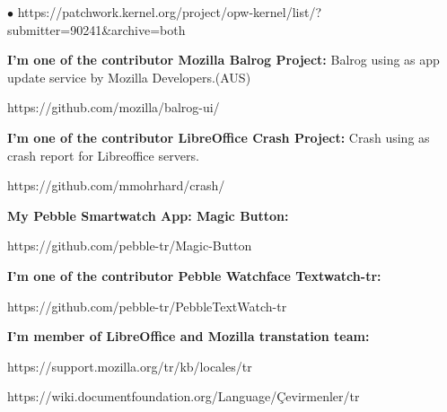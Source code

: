 \documentclass[margin,line]{res}
\newenvironment{list2}{
  \begin{list}{$\bullet$}{%
      \setlength{\itemsep}{0in}
      \setlength{\parsep}{0in} \setlength{\parskip}{0in}
      \setlength{\topsep}{0in} \setlength{\partopsep}{0in}
      \setlength{\leftmargin}{0.1in}}}{\end{list}}
\begin{document}
\begin{resume}
\begin{list2}
https://patchwork.kernel.org/project/opw-kernel/list/?submitter=90241\&archive=both
\item {\bf I'm one of the contributor Mozilla Balrog Project:} Balrog using as app update service by Mozilla Developers.(AUS)

https://github.com/mozilla/balrog-ui/
\item {\bf I'm one of the contributor LibreOffice Crash Project:} Crash using as crash report for Libreoffice servers.

https://github.com/mmohrhard/crash/
\item {\bf My Pebble Smartwatch App: Magic Button:}

https://github.com/pebble-tr/Magic-Button
\item {\bf I'm one of the contributor Pebble Watchface Textwatch-tr:}

https://github.com/pebble-tr/PebbleTextWatch-tr
\item {\bf I'm member of LibreOffice and Mozilla transtation team:}

https://support.mozilla.org/tr/kb/locales/tr

https://wiki.documentfoundation.org/Language/\c{C}evirmenler/tr
\end{list2}
\vspace{-.3cm}


\end{resume}
\end{document}
